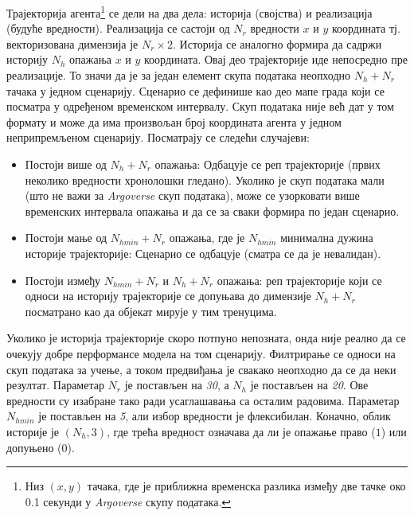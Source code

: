 \documentclass[11pt,oneside]{memoir}
\begin{document}
Трајекторија агента\footnote{Низ $(x, y)$ тачака, где је приближна временска разлика између две тачке око 0.1 секунди у \textit{Argoverse}
скупу података.} 
се дели на два дела: историја (својства) и реализација (будуће вредности). Реализација се састоји од $N_r$ вредности
$x$ и $y$ координата тј. векторизована димензија је $N_r\times 2$.
Историја се аналогно формира да садржи историју $N_h$ опажања $x$ и $y$ координата. Овај део трајекторије иде непосредно
пре реализације. То значи да је за један елемент скупа података неопходно $N_h + N_r$ тачака у једном сценарију. 
Сценарио се дефинише као део мапе града који се посматра
у одређеном временском интервалу. Скуп података није већ
дат у том формату и може да има произвољан број координата агента у једном неприпремљеном сценарију. Посматрају се следећи случајеви:
\begin{itemize}
  \item Постоји више од $N_h + N_r$ опажања: Одбацује се реп трајекторије (првих неколико вредности хронолошки гледано).
        Уколико је скуп података мали (што не важи за \textit{Argoverse} скуп података), може се узорковати више временских интервала
        опажања и да се за сваки формира по један сценарио.
  \item Постоји мање од $N_{hmin} + N_r$ опажања, где је $N_{hmin}$ минимална дужина историје трајекторије: Сценарио се одбацује (сматра се да је невалидан).
  \item Постоји између $N_{hmin} + N_r$ и $N_h + N_r$ опажања: реп трајекторије који се односи на историју трајекторије 
        се допуњава до димензије $N_h + N_r$ посматрано као да објекат мирује у тим тренуцима.
\end{itemize}
Уколико је историја
трајекторије скоро потпуно непозната, онда није реално да се очекују добре перформансе модела на том сценарију. Филтрирање се
односи на скуп података за учење, а током предвиђања је свакако неопходно да се да неки резултат. Параметар $N_r$ је постављен на \textit{30},
а $N_h$ је постављен на \textit{20}. Ове вредности су изабране тако ради усаглашавања са осталим радовима. Параметар $N_{hmin}$ је
постављен на \textit{5}, али избор вредности је флексибилан. 
Коначно, облик историје је $(N_h, 3)$, где трећа вредност означава да ли је опажање право ($1$) или допуњено ($0$).
\end{document}
